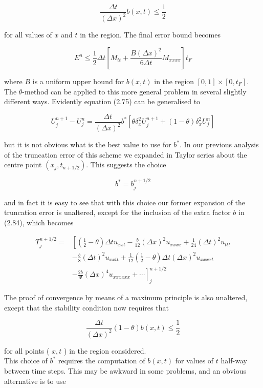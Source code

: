 \documentclass[10pt]{article}
\begin{document}
\[
\frac{\Delta t}{(\Delta x)^{2}} b(x, t) \leq \frac{1}{2}
\]

for all values of \(x\) and \(t\) in the region. The final error bound becomes

\[
E^{n} \leq \frac{1}{2} \Delta t\left[M_{t t}+\frac{B(\Delta x)^{2}}{6 \Delta t} M_{x x x x}\right] t_{F}
\]

where \(B\) is a uniform upper bound for \(b(x, t)\) in the region \([0,1] \times\left[0, t_{F}\right]\).\\
The \(\theta\)-method can be applied to this more general problem in several slightly different ways. Evidently equation (2.75) can be generalised to

\[
U_{j}^{n+1}-U_{j}^{n}=\frac{\Delta t}{(\Delta x)^{2}} b^{*}\left[\theta \delta_{x}^{2} U_{j}^{n+1}+(1-\theta) \delta_{x}^{2} U_{j}^{n}\right]
\]

but it is not obvious what is the best value to use for \(b^{*}\). In our previous analysis of the truncation error of this scheme we expanded in Taylor series about the centre point \(\left(x_{j}, t_{n+1 / 2}\right)\). This suggests the choice

\[
b^{*}=b_{j}^{n+1 / 2}
\]

and in fact it is easy to see that with this choice our former expansion of the truncation error is unaltered, except for the inclusion of the extra factor \(b\) in (2.84), which becomes

\[
\begin{aligned}
T_{j}^{n+1 / 2}= & {\left[\left(\frac{1}{2}-\theta\right) \Delta t u_{x x t}-\frac{b}{12}(\Delta x)^{2} u_{x x x x}+\frac{1}{24}(\Delta t)^{2} u_{t t t}\right.} \\
& -\frac{b}{8}(\Delta t)^{2} u_{x x t t}+\frac{1}{12}\left(\frac{1}{2}-\theta\right) \Delta t(\Delta x)^{2} u_{x x x x t} \\
& \left.-\frac{2 b}{6!}(\Delta x)^{4} u_{x x x x x x}+\cdots\right]_{j}^{n+1 / 2}
\end{aligned}
\]

The proof of convergence by means of a maximum principle is also unaltered, except that the stability condition now requires that

\[
\frac{\Delta t}{(\Delta x)^{2}}(1-\theta) b(x, t) \leq \frac{1}{2}
\]

for all points ( \(x, t\) ) in the region considered.\\
This choice of \(b^{*}\) requires the computation of \(b(x, t)\) for values of \(t\) half-way between time steps. This may be awkward in some problems, and an obvious alternative is to use
\end{document}
